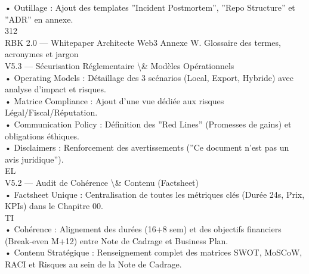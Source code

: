 • Outillage : Ajout des templates ”Incident Postmortem”, ”Repo Structure” et ”ADR” en annexe.\\
\vspace{0.5em}
\vspace{0.5em}
\vspace{0.5em}
\vspace{0.5em}
312\\
RBK 2.0 — Whitepaper Architecte Web3                                                                    Annexe W. Glossaire des termes, acronymes et jargon\\
\vspace{0.5em}
\vspace{0.5em}
\vspace{0.5em}
V5.3 — Sécurisation Réglementaire \textbackslash{}& Modèles Opérationnels\\
• Operating Models : Détaillage des 3 scénarios (Local, Export, Hybride) avec analyse d’impact et risques.\\
• Matrice Compliance : Ajout d’une vue dédiée aux risques Légal/Fiscal/Réputation.\\
• Communication Policy : Définition des ”Red Lines” (Promesses de gains) et obligations éthiques.\\
• Disclaimers : Renforcement des avertissements (”Ce document n’est pas un avis juridique”).\\
\vspace{0.5em}
\vspace{0.5em}
\vspace{0.5em}
\vspace{0.5em}
EL\\
V5.2 — Audit de Cohérence \textbackslash{}& Contenu (Factsheet)\\
• Factsheet Unique : Centralisation de toutes les métriques clés (Durée 24s, Prix, KPIs) dans le Chapitre 00.\\
\vspace{0.5em}
\vspace{0.5em}
\vspace{0.5em}
\vspace{0.5em}
TI\\
• Cohérence : Alignement des durées (16+8 sem) et des objectifs financiers (Break-even M+12) entre Note de Cadrage et Business Plan.\\
• Contenu Stratégique : Renseignement complet des matrices SWOT, MoSCoW, RACI et Risques au sein de la Note de Cadrage.\\
\vspace{0.5em}
